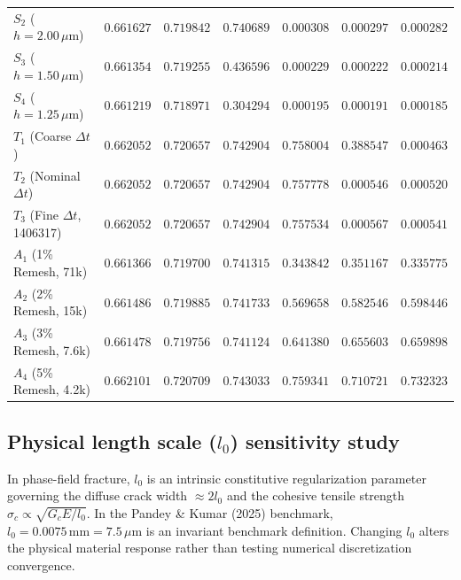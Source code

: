 \begin{table}[htbp]
\begin{tabularx}{\textwidth}{lrrrrrr}
$S_2$ ($h=2.00\,\mu\mathrm{m}$) & $0.661627$ & $0.719842$ & $0.740689$ & $0.000308$ & $0.000297$ & $0.000282$ \\
$S_3$ ($h=1.50\,\mu\mathrm{m}$) & $0.661354$ & $0.719255$ & $0.436596$ & $0.000229$ & $0.000222$ & $0.000214$ \\
$S_4$ ($h=1.25\,\mu\mathrm{m}$) & $0.661219$ & $0.718971$ & $0.304294$ & $0.000195$ & $0.000191$ & $0.000185$ \\
$T_1$ (Coarse $\Delta t$) & $0.662052$ & $0.720657$ & $0.742904$ & $0.758004$ & $0.388547$ & $0.000463$ \\
$T_2$ (Nominal $\Delta t$) & $0.662052$ & $0.720657$ & $0.742904$ & $0.757778$ & $0.000546$ & $0.000520$ \\
$T_3$ (Fine $\Delta t$, 1406317) & $0.662052$ & $0.720657$ & $0.742904$ & $0.757534$ & $0.000567$ & $0.000541$ \\
$A_1$ (1\% Remesh, 71k) & $0.661366$ & $0.719700$ & $0.741315$ & $0.343842$ & $0.351167$ & $0.335775$ \\
$A_2$ (2\% Remesh, 15k) & $0.661486$ & $0.719885$ & $0.741733$ & $0.569658$ & $0.582546$ & $0.598446$ \\
$A_3$ (3\% Remesh, 7.6k) & $0.661478$ & $0.719756$ & $0.741124$ & $0.641380$ & $0.655603$ & $0.659898$ \\
$A_4$ (5\% Remesh, 4.2k) & $0.662101$ & $0.720709$ & $0.743033$ & $0.759341$ & $0.710721$ & $0.732323$ \\
\bottomrule
\end{tabularx}
\end{table}

\subsection{Physical length scale ($l_0$) sensitivity study}
In phase-field fracture, $l_0$ is an intrinsic constitutive regularization parameter governing the diffuse crack width $\approx 2 l_0$ and the cohesive tensile strength $\sigma_c \propto \sqrt{G_c E / l_0}$. In the Pandey \& Kumar (2025) benchmark, $l_0 = 0.0075\,\mathrm{mm} = 7.5\,\mu\mathrm{m}$ is an invariant benchmark definition. Changing $l_0$ alters the physical material response rather than testing numerical discretization convergence.

